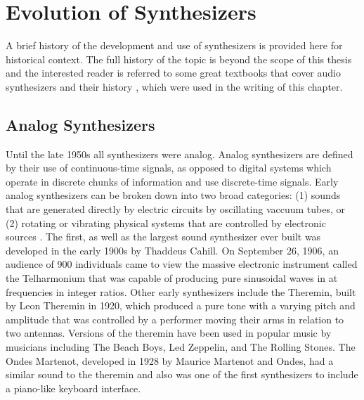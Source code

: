 

\section{Evolution of Synthesizers}
\label{section:synth-history}

A brief history of the development and use of synthesizers is provided here for historical context. The full history of the topic is beyond the scope of this thesis and the interested reader is referred to some great textbooks that cover audio synthesizers and their history \cite{roads1980interview, mcguire2015musical, jenkins2019analog, russ2012sound}, which were used in the writing of this chapter.
\subsection{Analog Synthesizers}
Until the late 1950s all synthesizers were analog. Analog synthesizers are defined by their use of continuous-time signals, as opposed to digital systems which operate in discrete chunks of information and use discrete-time signals. Early analog synthesizers can be broken down into two broad categories: (1) sounds that are generated directly by electric circuits by oscillating vaccuum tubes, or (2) rotating or vibrating physical systems that are controlled by electronic sources \cite{roads1996computer}. The first, as well as the largest sound synthesizer ever built was developed in the early 1900s by Thaddeus Cahill. On September 26, 1906, an audience of 900 individuals came to view the massive electronic instrument called the Telharmonium that was capable of producing pure sinusoidal waves in at frequencies in integer ratios. Other early synthesizers include the Theremin, built by Leon Theremin in 1920, which produced a pure tone with a varying pitch and amplitude that was controlled by a performer moving their arms in relation to two antennas. Versions of the theremin have been used in popular music by musicians including The Beach Boys, Led Zeppelin, and The Rolling Stones.  The Ondes Martenot, developed in 1928 by Maurice Martenot and Ondes, had a similar sound to the theremin and also was one of the first synthesizers to include a piano-like keyboard interface.

